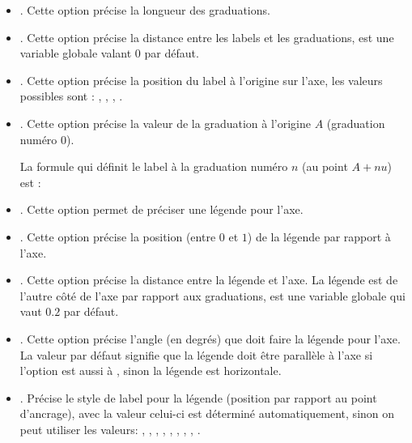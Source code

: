 \begin{itemize}
    \item {}. Cette option précise la longueur des graduations.
    
    \item {}. Cette option précise la distance entre les labels et les graduations,  est une variable globale valant $0$ par défaut.
    
    \item {}. Cette option précise la position du label à l'origine sur l'axe, les valeurs possibles sont : , , , .
    
    \item {}. Cette option précise la valeur de la graduation à l'origine $A$ (graduation numéro $0$).
    
    La formule qui définit le label à la graduation numéro $n$ (au point $A+nu$) est : 

    \item {}. Cette option permet de préciser une légende pour l'axe.
    
    \item {}. Cette option précise la position (entre $0$ et $1$) de la légende par rapport à l'axe.
    
    \item {}. Cette option précise la distance entre la légende et l'axe. La légende est de l'autre côté de l'axe par rapport aux graduations,  est une variable globale qui vaut $0.2$ par défaut.
    
    \item {}. Cette option précise l'angle (en degrés) que doit faire la légende pour l'axe. La valeur  par défaut signifie que la légende doit être parallèle à l'axe si l'option  est aussi à , sinon la légende est horizontale.
    
    \item {}. Précise le style de label pour la légende (position par rapport au point d'ancrage), avec la valeur  celui-ci est déterminé automatiquement, sinon on peut utiliser les valeurs: , , , , , , , , .
    

\end{itemize}
